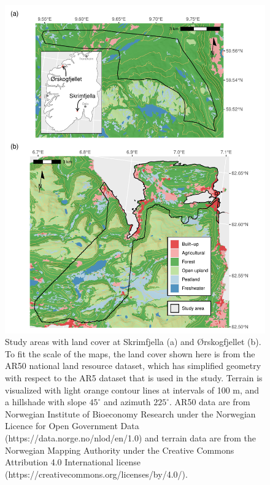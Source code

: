 \documentclass[soil, manuscript]{copernicus}
\begin{document}
\begin{figure}
\includegraphics[height=0.81\textheight]{figures/map-sites} \caption{Study areas with land cover at Skrimfjella (a) and Ørskogfjellet (b). To fit the scale of the maps, the land cover shown here is from the AR50 national land resource dataset, which has simplified geometry with respect to the AR5 dataset that is used in the study. Terrain is visualized with light orange contour lines at intervals of 100 m, and a hillshade with slope $45^\circ$ and azimuth $225^\circ$. AR50 data are from Norwegian Institute of Bioeconomy Research under the Norwegian Licence for Open Government Data (https://data.norge.no/nlod/en/1.0) and terrain data are from the Norwegian Mapping Authority under the Creative Commons Attribution 4.0 International license (https://creativecommons.org/licenses/by/4.0/).}\label{fig:map-sites}
\end{figure}
\end{document}
